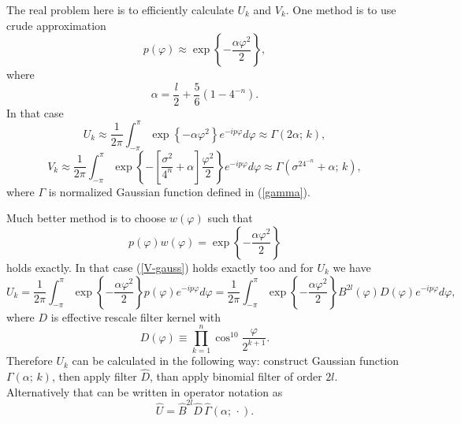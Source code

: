 \documentclass[10pt]{article}
\begin{document}
The real problem here is to efficiently calculate $U_k$ and $V_k$. One method is to use crude
approximation
\begin{equation}
    p(\varphi) \approx \exp\left\{-\frac{\alpha\varphi^2}2\right\},
\end{equation}
where
\begin{equation}\label{alpha}
    \alpha = \frac l2 + \frac56(1 - 4^{-n}).
\end{equation}
In that case
\begin{equation}
    U_k \approx \frac1{2\pi}\int_{-\pi}^\pi
        \exp\left\{-\alpha\varphi^2\right\}e^{-ip\varphi}d\varphi \approx \Gamma(2\alpha;\, k),
\end{equation}
\begin{equation}\label{V-gauss}
    V_k \approx \frac1{2\pi}\int_{-\pi}^\pi
        \exp\left\{-\left[\frac{\sigma^2}{4^n} + \alpha\right]\frac{\varphi^2}2\right\}
        e^{-ip\varphi}d\varphi \approx \Gamma(\sigma^24^{-n} + \alpha;\, k),
\end{equation}
where $\Gamma$ is normalized Gaussian function defined in (\ref{gamma}).

Much better method is to choose $w(\varphi)$ such that
\begin{equation}
    p(\varphi)w(\varphi) = \exp\left\{-\frac{\alpha\varphi^2}2\right\}
\end{equation}
holds exactly. In that case (\ref{V-gauss}) holds exactly too and for $U_k$ we
have
\begin{equation}
    U_k = \frac1{2\pi}\int_{-\pi}^\pi \exp\left\{-\frac{\alpha\varphi^2}2\right\}
        p(\varphi)e^{-ip\varphi}d\varphi =
    \frac1{2\pi}\int_{-\pi}^\pi \exp\left\{-\frac{\alpha\varphi^2}2\right\}
        B^{2l}(\varphi)D(\varphi)e^{-ip\varphi}d\varphi,
\end{equation}
where $D$ is effective rescale filter kernel with
\begin{equation}
    D(\varphi) \equiv \prod_{k=1}^n \cos^{10}\frac\varphi{2^{k+1}}.
\end{equation}
Therefore $U_k$ can be calculated in the following way: construct Gaussian function
$\Gamma(\alpha;\, k)$, then apply filter $\hat D$, than apply binomial filter of order $2l$.
Alternatively that can be written in operator notation as
\begin{equation}
    \hat U = \hat B^{2l}\hat D\,\hat\Gamma(\alpha;\, \cdot).
\end{equation}
\end{document}
